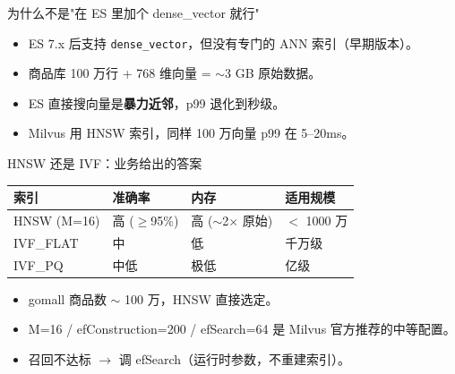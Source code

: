 \begin{frame}{为什么不是"在 ES 里加个 dense\_vector 就行"}
\begin{itemize}
  \item ES 7.x 后支持 \texttt{dense\_vector}，但没有专门的 ANN 索引（早期版本）。
  \item 商品库 100 万行 + 768 维向量 = $\sim$3 GB 原始数据。
  \item ES 直接搜向量是\textbf{暴力近邻}，p99 退化到秒级。
  \item Milvus 用 HNSW 索引，同样 100 万向量 p99 在 5--20ms。
\end{itemize}
\vspace{2mm}
\end{frame}

\begin{frame}{HNSW 还是 IVF：业务给出的答案}
\begin{tabular}{@{}llll@{}}
\toprule
索引 & 准确率 & 内存 & 适用规模 \\
\midrule
HNSW (M=16) & 高 ($\geq$95\%) & 高 ($\sim$2$\times$ 原始) & $<$ 1000 万 \\
IVF\_FLAT   & 中             & 低                       & 千万级 \\
IVF\_PQ     & 中低           & 极低                     & 亿级 \\
\bottomrule
\end{tabular}
\vspace{3mm}
\begin{itemize}
  \item gomall 商品数 $\sim$ 100 万，HNSW 直接选定。
  \item M=16 / efConstruction=200 / efSearch=64 是 Milvus 官方推荐的中等配置。
  \item 召回不达标 $\to$ 调 efSearch（运行时参数，不重建索引）。
\end{itemize}
\end{frame}

